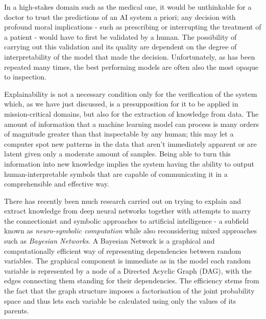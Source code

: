 In a high-stakes domain such as the medical one, it would be unthinkable for a doctor to trust the predictions of an AI system a priori; any decision with profound moral implications - such as prescribing or interrupting the treatment of a patient - would have to first be validated by a human.  The possibility of carrying out this validation and its quality are dependent on the degree of interpretability of the model that made the decision.  Unfortunately, as has been repeated many times, the best performing models are often also the most opaque to inspection.

Explainability is not a necessary condition only for the verification of the system which,  as we have just discussed, is a presupposition for it to be applied in mission-critical domains, but also  for the extraction of knowledge from data.  The amount of information that a machine learning model can process is many orders of magnitude greater than that inspectable by any human; this may let a computer spot new patterns in the data that aren't immediately apparent or are latent given only a moderate amount of samples.  Being able to turn this information into  new knowledge implies the system having the ability to output human-interpretable symbols that are capable of communicating it in a comprehensible and effective way.

There has recently been much research carried out on trying to explain and extract knowledge from deep neural networks together with attempts to marry the connectionist and symbolic approaches to artificial intelligence - a subfield known as \textit{neuro-symbolic computation} while also reconsidering mixed approaches such as \textit{Bayesian Networks}.
A Bayesian Network is a graphical and computationally efficient way of representing dependencies between random variables.  The graphical component is immediate as in the model each random variable is represented by a node of a Directed Acyclic Graph (DAG), with the edges connecting them standing for their dependencies.  The efficiency stems from the fact that the graph structure imposes a factorisation of the joint probability space and thus lets each variable be calculated using only the values of its parents.


